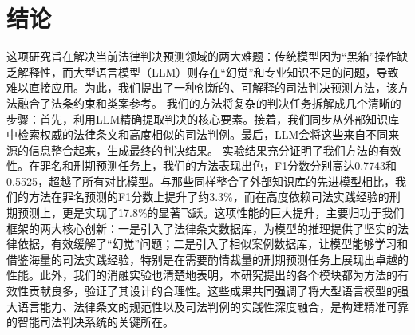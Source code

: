 
\section{\heiti 结论}
这项研究旨在解决当前法律判决预测领域的两大难题：传统模型因为“黑箱”操作缺乏解释性，而大型语言模型（LLM）则存在“幻觉”和专业知识不足的问题，导致难以直接应用。为此，我们提出了一种创新的、可解释的司法判决预测方法，该方法融合了法条约束和类案参考。
我们的方法将复杂的判决任务拆解成几个清晰的步骤：首先，利用LLM精确提取判决的核心要素。接着，我们同步从外部知识库中检索权威的法律条文和高度相似的司法判例。最后，LLM会将这些来自不同来源的信息整合起来，生成最终的判决结果。
实验结果充分证明了我们方法的有效性。在罪名和刑期预测任务上，我们的方法表现出色，F1分数分别高达0.7743和0.5525，超越了所有对比模型。与那些同样整合了外部知识库的先进模型相比，我们的方法在罪名预测的F1分数上提升了约3.3\%，而在高度依赖司法实践经验的刑期预测上，更是实现了17.8\%的显著飞跃。这项性能的巨大提升，主要归功于我们框架的两大核心创新：一是引入了法律条文数据库，为模型的推理提供了坚实的法律依据，有效缓解了“幻觉”问题；二是引入了相似案例数据库，让模型能够学习和借鉴海量的司法实践经验，特别是在需要酌情裁量的刑期预测任务上展现出卓越的性能。此外，我们的消融实验也清楚地表明，本研究提出的各个模块都为方法的有效性贡献良多，验证了其设计的合理性。这些成果共同强调了将大型语言模型的强大语言能力、法律条文的规范性以及司法判例的实践性深度融合，是构建精准可靠的智能司法判决系统的关键所在。
